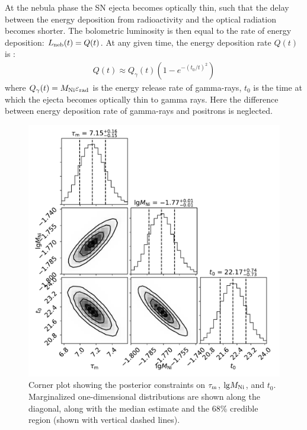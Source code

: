 \documentclass[twocolumn]{aastex63}
\begin{document}
\begin{CJK*}{UTF8}{gbsn}
At the nebula phase the SN ejecta becomes optically thin, such that the delay between the energy 
deposition from radioactivity and the optical radiation becomes shorter. The bolometric luminosity is 
then equal to 
the rate of energy deposition: $L_{\rm neb}(t) = Q(t)$. At any given time, the energy deposition rate 
$Q(t)$ is \citep{Wheeler2015, Wygoda2019}:
\begin{align}
Q(t) \approx Q_{\gamma}(t) \left( 1 - e^{-(t_0/t)^2}\right) %
\end{align}
where $Q_{\gamma}(t) = M_{\rm Ni}\varepsilon_{\rm rad}$ is the energy release rate of gamma-rays,
$t_0$ is the time at which the ejecta becomes optically thin to gamma rays. Here the difference 
between energy deposition rate of gamma-rays and positrons  is neglected.


\begin{figure}[htbp!]
	\centering
	\includegraphics[width=\columnwidth]{figures/corner_arnett_modified.pdf}
	\caption{Corner plot showing the posterior constraints on $\tau_{\rm m}$, ${\rm lg}M_{\rm 
			Ni}$, and $t_0$. Marginalized one-dimensional distributions are shown along the 
		diagonal, along with the median estimate and the 68\% credible region (shown with vertical 
		dashed 
		lines).	\label{fig:Nidecaycorner}}
\end{figure}


\end{CJK*}
\end{document}
